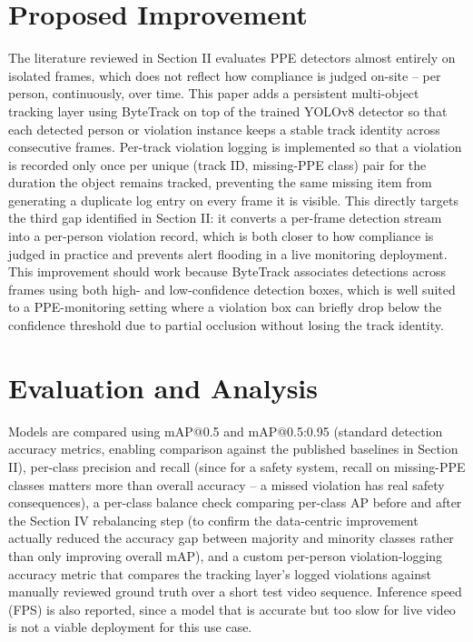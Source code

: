 \documentclass[conference]{IEEEtran}
\begin{document}
\section{Proposed Improvement}

The literature reviewed in Section II evaluates PPE detectors almost entirely on isolated frames, which does not reflect how compliance is judged on-site -- per person, continuously, over time. This paper adds a persistent multi-object tracking layer using ByteTrack on top of the trained YOLOv8 detector so that each detected person or violation instance keeps a stable track identity across consecutive frames. Per-track violation logging is implemented so that a violation is recorded only once per unique (track ID, missing-PPE class) pair for the duration the object remains tracked, preventing the same missing item from generating a duplicate log entry on every frame it is visible. This directly targets the third gap identified in Section II: it converts a per-frame detection stream into a per-person violation record, which is both closer to how compliance is judged in practice and prevents alert flooding in a live monitoring deployment. This improvement should work because ByteTrack associates detections across frames using both high- and low-confidence detection boxes, which is well suited to a PPE-monitoring setting where a violation box can briefly drop below the confidence threshold due to partial occlusion without losing the track identity.

\section{Evaluation and Analysis}

Models are compared using mAP@0.5 and mAP@0.5:0.95 (standard detection accuracy metrics, enabling comparison against the published baselines in Section II), per-class precision and recall (since for a safety system, recall on missing-PPE classes matters more than overall accuracy -- a missed violation has real safety consequences), a per-class balance check comparing per-class AP before and after the Section IV rebalancing step (to confirm the data-centric improvement actually reduced the accuracy gap between majority and minority classes rather than only improving overall mAP), and a custom per-person violation-logging accuracy metric that compares the tracking layer's logged violations against manually reviewed ground truth over a short test video sequence. Inference speed (FPS) is also reported, since a model that is accurate but too slow for live video is not a viable deployment for this use case.
\end{document}
